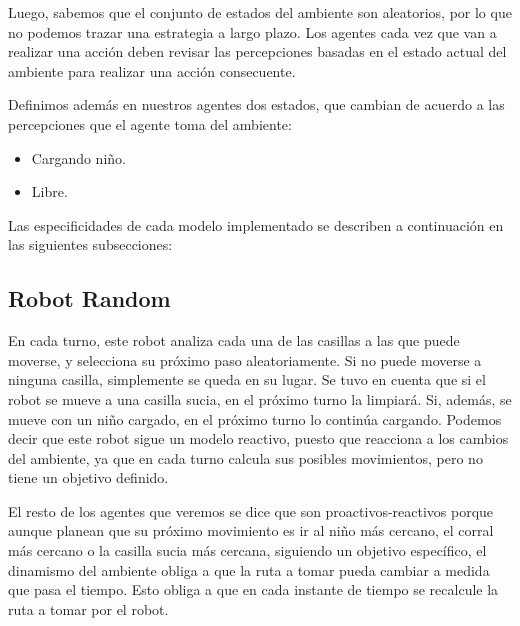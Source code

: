 \documentclass[twoside]{article}
\begin{document}
Luego, sabemos que el conjunto de estados del ambiente son aleatorios, por lo que no podemos trazar una estrategia a largo plazo. Los agentes cada vez que van a realizar una acci\'on deben revisar las percepciones basadas en el estado actual del ambiente para realizar una acci\'on consecuente.

Definimos adem\'as en nuestros agentes dos estados, que cambian de acuerdo a las percepciones que el agente toma del ambiente:
\begin{itemize}
\item Cargando ni\~no.
\item Libre.
\end{itemize}

Las especificidades de cada modelo implementado se describen a continuaci\'on en las siguientes subsecciones:

\subsection{Robot Random}
En cada turno, este robot analiza cada una de las casillas a las que puede moverse, y selecciona su pr\'oximo paso aleatoriamente. Si no puede moverse a ninguna casilla, simplemente se queda en su lugar. Se tuvo en cuenta que si el robot se mueve a una casilla sucia, en el pr\'oximo turno la limpiar\'a. Si, adem\'as, se mueve con un ni\~no cargado, en el pr\'oximo turno lo contin\'ua cargando. Podemos decir que este robot sigue un modelo reactivo, puesto que reacciona a los cambios del ambiente, ya que en cada turno calcula sus posibles movimientos, pero no tiene un objetivo definido.

El resto de los agentes que veremos se dice que son proactivos-reactivos porque aunque planean que su pr\'oximo movimiento es ir al ni\~no m\'as cercano, el corral m\'as cercano o la casilla sucia m\'as cercana, siguiendo un objetivo espec\'ifico, el dinamismo del ambiente obliga a que la ruta a tomar pueda cambiar a medida que pasa el tiempo. Esto obliga a que en cada instante de tiempo se recalcule la ruta a tomar por el robot.
\end{document}

